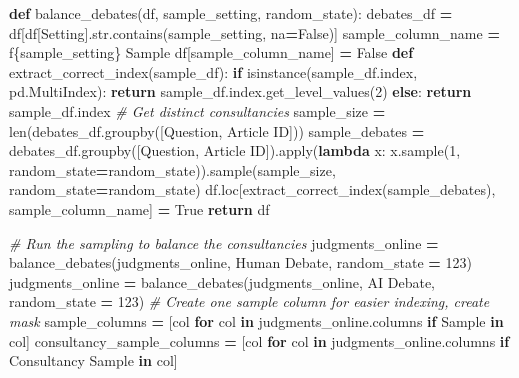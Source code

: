 \documentclass[
]{article}
\newenvironment{Shaded}{\begin{snugshade}}{\end{snugshade}}
\newcommand{\BuiltInTok}[1]{#1}
\newcommand{\CommentTok}[1]{\textcolor[rgb]{0.56,0.35,0.01}{\textit{#1}}}
\newcommand{\ControlFlowTok}[1]{\textcolor[rgb]{0.13,0.29,0.53}{\textbf{#1}}}
\newcommand{\DecValTok}[1]{\textcolor[rgb]{0.00,0.00,0.81}{#1}}
\newcommand{\KeywordTok}[1]{\textcolor[rgb]{0.13,0.29,0.53}{\textbf{#1}}}
\newcommand{\NormalTok}[1]{#1}
\newcommand{\OperatorTok}[1]{\textcolor[rgb]{0.81,0.36,0.00}{\textbf{#1}}}
\newcommand{\SpecialCharTok}[1]{\textcolor[rgb]{0.00,0.00,0.00}{#1}}
\newcommand{\SpecialStringTok}[1]{\textcolor[rgb]{0.31,0.60,0.02}{#1}}
\newcommand{\StringTok}[1]{\textcolor[rgb]{0.31,0.60,0.02}{#1}}
\newcommand{\VariableTok}[1]{\textcolor[rgb]{0.00,0.00,0.00}{#1}}
\begin{document}
\begin{Shaded}
\begin{Highlighting}[]
\KeywordTok{def}\NormalTok{ balance\_debates(df, sample\_setting, random\_state):}
\NormalTok{    debates\_df }\OperatorTok{=}\NormalTok{ df[df[}\StringTok{\textquotesingle{}Setting\textquotesingle{}}\NormalTok{].}\BuiltInTok{str}\NormalTok{.contains(sample\_setting, na}\OperatorTok{=}\VariableTok{False}\NormalTok{)]}
\NormalTok{    sample\_column\_name }\OperatorTok{=} \SpecialStringTok{f\textquotesingle{}}\SpecialCharTok{\{}\NormalTok{sample\_setting}\SpecialCharTok{\}}\SpecialStringTok{ Sample\textquotesingle{}}
\NormalTok{    df[sample\_column\_name] }\OperatorTok{=} \VariableTok{False}
    \KeywordTok{def}\NormalTok{ extract\_correct\_index(sample\_df):}
        \ControlFlowTok{if} \BuiltInTok{isinstance}\NormalTok{(sample\_df.index, pd.MultiIndex):}
            \ControlFlowTok{return}\NormalTok{ sample\_df.index.get\_level\_values(}\DecValTok{2}\NormalTok{)}
        \ControlFlowTok{else}\NormalTok{:}
            \ControlFlowTok{return}\NormalTok{ sample\_df.index}
    \CommentTok{\# Get distinct consultancies}
\NormalTok{    sample\_size }\OperatorTok{=} \BuiltInTok{len}\NormalTok{(debates\_df.groupby([}\StringTok{\textquotesingle{}Question\textquotesingle{}}\NormalTok{, }\StringTok{\textquotesingle{}Article ID\textquotesingle{}}\NormalTok{]))}
\NormalTok{    sample\_debates }\OperatorTok{=}\NormalTok{ debates\_df.groupby([}\StringTok{\textquotesingle{}Question\textquotesingle{}}\NormalTok{, }\StringTok{\textquotesingle{}Article ID\textquotesingle{}}\NormalTok{]).}\BuiltInTok{apply}\NormalTok{(}\KeywordTok{lambda}\NormalTok{ x: x.sample(}\DecValTok{1}\NormalTok{, random\_state}\OperatorTok{=}\NormalTok{random\_state)).sample(sample\_size, random\_state}\OperatorTok{=}\NormalTok{random\_state)}
\NormalTok{    df.loc[extract\_correct\_index(sample\_debates), sample\_column\_name] }\OperatorTok{=} \VariableTok{True}
    \ControlFlowTok{return}\NormalTok{ df}

\CommentTok{\# Run the sampling to balance the consultancies}
\NormalTok{judgments\_online }\OperatorTok{=}\NormalTok{ balance\_debates(judgments\_online, }\StringTok{\textquotesingle{}Human Debate\textquotesingle{}}\NormalTok{, random\_state }\OperatorTok{=} \DecValTok{123}\NormalTok{)}
\NormalTok{judgments\_online }\OperatorTok{=}\NormalTok{ balance\_debates(judgments\_online, }\StringTok{\textquotesingle{}AI Debate\textquotesingle{}}\NormalTok{, random\_state }\OperatorTok{=} \DecValTok{123}\NormalTok{)}
\CommentTok{\# Create one sample column for easier indexing, create mask}
\NormalTok{sample\_columns }\OperatorTok{=}\NormalTok{ [col }\ControlFlowTok{for}\NormalTok{ col }\KeywordTok{in}\NormalTok{ judgments\_online.columns }\ControlFlowTok{if} \StringTok{\textquotesingle{}Sample\textquotesingle{}} \KeywordTok{in}\NormalTok{ col]}
\NormalTok{consultancy\_sample\_columns }\OperatorTok{=}\NormalTok{ [col }\ControlFlowTok{for}\NormalTok{ col }\KeywordTok{in}\NormalTok{ judgments\_online.columns }\ControlFlowTok{if} \StringTok{\textquotesingle{}Consultancy Sample\textquotesingle{}} \KeywordTok{in}\NormalTok{ col]}


\end{Highlighting}
\end{Shaded}
\end{document}
